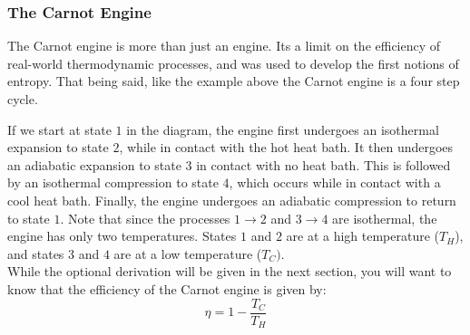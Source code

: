 \subsubsection{The Carnot Engine}
The Carnot engine is more than just an engine. Its a limit on the efficiency of real-world thermodynamic processes, and was used to develop the first notions of entropy. That being said, like the example above the Carnot engine is a four step cycle.
\begin{center}

\end{center}
If we start at state $1$ in the diagram, the engine first undergoes an isothermal expansion to state $2$, while in contact with the hot heat bath. It then undergoes an adiabatic expansion to state $3$ in contact with no heat bath. This is followed by an isothermal compression to state $4$, which occurs while in contact with a cool heat bath. Finally, the engine undergoes an adiabatic compression to return to state $1$. Note that since the processes $1 \rightarrow 2$ and $3 \rightarrow 4$ are isothermal, the engine has only two temperatures. States $1$ and $2$ are at a high temperature ($T_H$), and states $3$ and $4$ are at a low temperature ($T_C)$. \\
While the optional derivation will be given in the next section, you will want to know that the efficiency of the Carnot engine is given by:
\begin{equation}
    \eta = 1 -\frac{T_C}{T_H}
\end{equation}
